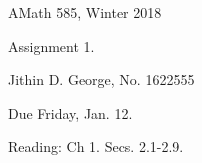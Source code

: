 \documentclass[letterpaper,12pt]{article}
\begin{document}




\noindent
{\scriptsize AMath 585, Winter 2018} \hfill 

\begin{center}
\large
Assignment 1. 
\normalsize

Jithin D. George, No. 1622555

\end{center}


\noindent
Due Friday, Jan. 12.
\vspace{.3in}




\noindent
Reading:  Ch 1. Secs. 2.1-2.9.
\vspace{.5cm}
\end{document}
